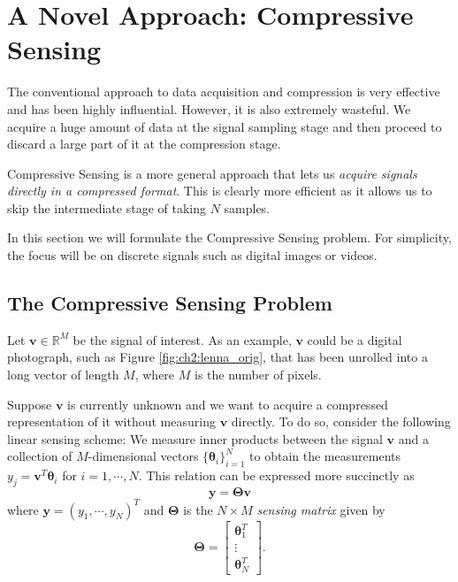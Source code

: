 \section{A Novel Approach: Compressive Sensing}
The conventional approach to data acquisition and compression is very effective and has been highly influential.
However, it is also extremely wasteful.
We acquire a huge amount of data at the signal sampling stage and then proceed to discard a large part of it at the compression stage.

Compressive Sensing is a more general approach that lets us \emph{acquire signals directly in a compressed format}.
This is clearly more efficient as it allows us to skip the intermediate stage of taking $N$ samples.

In this section we will formulate the Compressive Sensing problem.
For simplicity, the focus will be on discrete signals such as digital images or videos.

\subsection{The Compressive Sensing Problem}
Let $\bm v \in\mathbb{R}^M$ be the signal of interest.
As an example, $\bm v$ could be a digital photograph, such as Figure \ref{fig:ch2:lenna_orig}, that has been unrolled into a long vector of length $M$, where $M$ is the number of pixels.

Suppose $\bm v$ is currently unknown and we want to acquire a compressed representation of it without measuring $\bm v$ directly.
To do so, consider the following linear sensing scheme:
We measure inner products between the signal $\bm v$ and a collection of $M$-dimensional vectors $\{\bm\theta_i\}_{i=1}^N$ to obtain the measurements $y_j = \bm v^T\bm\theta_i$ for $i = 1,\cdots,N$. 
This relation can be expressed more succinctly as%
\begin{equation}
\label{eqn:cs_sensing}
  \bm y = \bm\Theta\bm v
\end{equation}
where $\bm y = (y_1,\cdots,y_N)^T$ and $\bm\Theta$ is the $N\times M$ \emph{sensing matrix} given by
\begin{equation}
\label{eqn:ch2:sensor2}
  \bm\Theta = 
  \begin{bmatrix} 
    \bm \theta_1^T\\
    \vdots\\
    \bm \theta_N^T
  \end{bmatrix}.
\end{equation}

